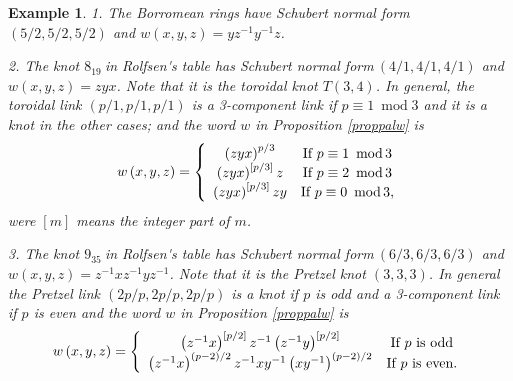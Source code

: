 \documentclass[12pt]{article}%
\newtheorem{example}[theorem]{Example}
\begin{document}
\begin{example}
1. The Borromean rings have Schubert normal form $\left(  5/2,5/2,5/2\right)
$ and $w\left(  x,y,z\right)  =yz^{-1}y^{-1}z$.

2. The knot $8_{19}\ $in Rolfsen\'{}s
 table has Schubert normal form$\ \left(  4/1,4/1,4/1\right)  $ and $w\left(
x,y,z\right)  =zyx$. Note that it is the toroidal knot $T\left(  3,4\right)
$. In general, the toroidal link $\left(  p/1,p/1,p/1\right)  $ is a
3-component link if $p\equiv1\ \operatorname{mod}3$ and it is a knot in the
other cases; and the word $w$ in Proposition \ref{proppalw} is
\[
w\left(  x,y,z\right)  =\left\{
\begin{array}
[c]{cc}%
\left(  zyx\right)  ^{p/3} & \text{If }p\equiv1\ \operatorname{mod}3\\
\left(  zyx\right)  ^{[p/3]}z & \text{If }p\equiv2\ \operatorname{mod}3\\
\left(  zyx\right)  ^{[p/3]}zy & \text{If }p\equiv0\ \operatorname{mod}3,
\end{array}
\right.
\]
were $\left[  m\right]  $ means the integer part of $m$.

3. The knot $9_{35}\ $in Rolfsen\'{}s
 table has Schubert normal form$\ \left(  6/3,6/3,6/3\right)  $ and $w\left(
x,y,z\right)  =z^{-1}xz^{-1}yz^{-1}$. Note that it is the Pretzel knot
$\left(  3,3,3\right)  $. In general the Pretzel link $\left(
2p/p,2p/p,2p/p\right)  $ is a knot if $p$ is odd and a 3-component link if $p$
is even and the word $w$ in Proposition \ref{proppalw} is
\[
w\left(  x,y,z\right)  =\left\{
\begin{array}
[c]{cc}%
\left(  z^{-1}x\right)  ^{\left[  p/2\right]  }z^{-1}\left(  z^{-1}y\right)
^{\left[  p/2\right]  } & \text{If }p\ \text{is odd}\\
\left(  z^{-1}x\right)  ^{(p-2)/2}z^{-1}xy^{-1}\left(  xy^{-1}\right)
^{\left(  p-2\right)  /2} & \text{If }p\ \text{is even.}%
\end{array}
\right.
\]

\end{example}
\end{document}
